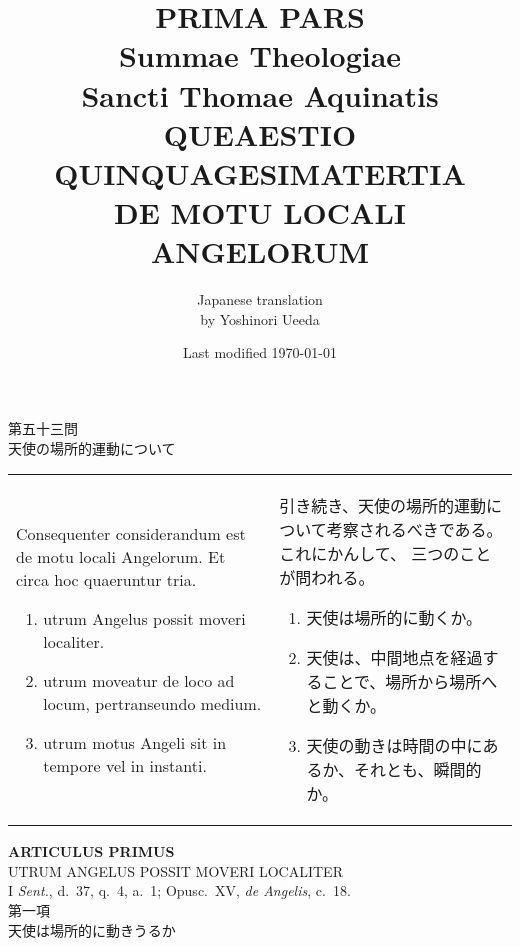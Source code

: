 \documentclass[10pt]{jsarticle} %
\title{{\bf PRIMA PARS}\\{\HUGE Summae Theologiae}\\Sancti Thomae
Aquinatis\\{\sffamily QUEAESTIO QUINQUAGESIMATERTIA}\\DE MOTU LOCALI ANGELORUM}
\author{Japanese translation\\by Yoshinori {\sc Ueeda}}
\date{Last modified \today}
\begin{document}
\maketitle
\pagestyle{fancy}

\begin{center}
{\Large 第五十三問\\天使の場所的運動について}
\end{center}

\begin{longtable}{p{21em}p{21em}}
Consequenter considerandum est de motu locali Angelorum. Et circa hoc
 quaeruntur tria.

\begin{enumerate}
 \item utrum Angelus possit moveri localiter.
 \item utrum moveatur de loco ad locum, pertranseundo medium.
 \item utrum motus Angeli sit in tempore vel in instanti.
\end{enumerate}

&

引き続き、天使の場所的運動について考察されるべきである。これにかんして、
 三つのことが問われる。

\begin{enumerate}
 \item 天使は場所的に動くか。
 \item 天使は、中間地点を経過することで、場所から場所へと動くか。
 \item 天使の動きは時間の中にあるか、それとも、瞬間的か。
\end{enumerate}


\end{longtable}

\newpage

\begin{center}
 {\Large {\bf ARTICULUS PRIMUS}}\\
 {\large UTRUM ANGELUS POSSIT MOVERI LOCALITER}\\
 {\footnotesize I {\itshape Sent.}, d.~37, q.~4, a.~1; Opusc.~XV,
 {\itshape de Angelis}, c.~18.}\\
 {\Large 第一項\\天使は場所的に動きうるか}
\end{center}
\end{document}
